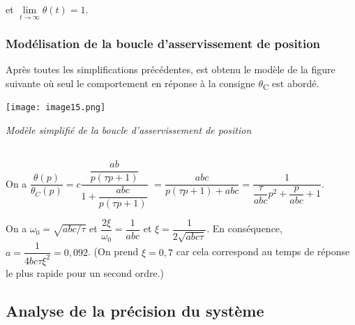 \begin{multicols}{2}
\begin{corrige}
et $\lim\limits_{t\to\infty} \theta(t) = 1$.
\end{corrige}
\else
\fi

\subsubsection*{Modélisation de la boucle d'asservissement de position}
\ifprof
\else

Après toutes les simplifications précédentes, est obtenu le modèle de la
figure suivante où seul le comportement en réponse à la consigne
$\theta$\textsubscript{C} est abordé.


\begin{center}
\texttt{[image: image15.png]}

\textit{Modèle simplifié de la boucle d'asservissement de
position \label{fig14}}
\end{center}

\fi



\ifprof
\begin{corrige}~\\

On a $\dfrac{\theta(p)}{\theta_C(p)}=c\dfrac{\dfrac{ab}{p\left( \tau p + 1\right)}}{1+\dfrac{abc}{p\left( \tau p + 1\right)}}$
$=\dfrac{{abc}}{p\left( \tau p + 1\right)+{abc}}=\dfrac{1}{ \dfrac{\tau}{abc} p^2 + \dfrac{p}{abc}+1}$.

On a $\omega_0 = \sqrt{abc/\tau}$ et $\dfrac{2\xi}{\omega_0}=\dfrac{1}{abc}$ et 
$\xi=\dfrac{1}{2\sqrt{abc\tau}}$. 
En conséquence, ${a}=\dfrac{1}{4bc\tau\xi^2}=0,092$. (On prend $\xi=0,7$ car cela correspond au temps de réponse le plus rapide pour un second ordre.)
\end{corrige}
\else
\fi
  

\subsection*{Analyse de la précision du système}
\ifprof
\else


\end{multicols}
